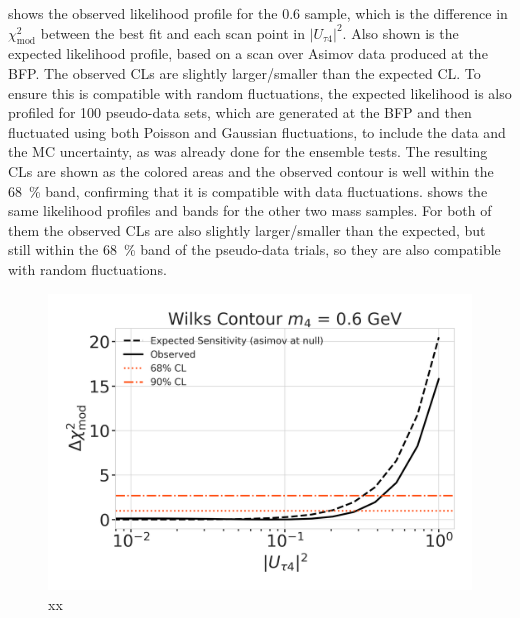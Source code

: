  shows the observed likelihood profile for the \SI{0.6}{\gev} sample, which is the difference in $\chi^2_{\mathrm{mod}}$ between the best fit and each scan point in $|U_{\tau4}|^2$. Also shown is the expected likelihood profile, based on a scan over Asimov data produced at the BFP. The observed CLs are slightly larger/smaller than the expected CL. To ensure this is compatible with random fluctuations, the expected likelihood is also profiled for 100 pseudo-data sets, which are generated at the BFP and then fluctuated using both Poisson and Gaussian fluctuations, to include the data and the MC uncertainty, as was already done for the ensemble tests. The resulting CLs are shown as the colored areas and the observed contour is well within the \SI{68}{\percent} band, confirming that it is compatible with data fluctuations.  shows the same likelihood profiles and bands for the other two mass samples. For both of them the observed CLs are also slightly larger/smaller than the expected, but still within the \SI{68}{\percent} band of the pseudo-data trials, so they are also compatible with random fluctuations.

\begin{figure}[h]
    \includegraphics{figures/results/best_fit/sensitivity_and_wilks_scan_0.6_GeV_with_1sigma.png}
	\caption[xx]{xx}
\end{figure}


